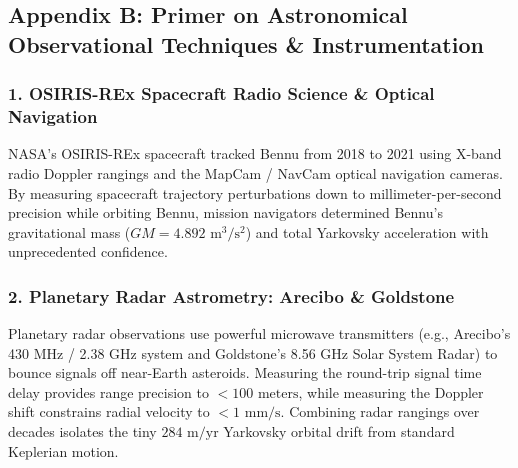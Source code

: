 \documentclass[11pt,a4paper]{article}
\begin{document}
\subsection*{Appendix B: Primer on Astronomical Observational Techniques \& Instrumentation}

\subsubsection*{1. OSIRIS-REx Spacecraft Radio Science \& Optical Navigation}
NASA's OSIRIS-REx spacecraft tracked Bennu from 2018 to 2021 using X-band radio Doppler rangings and the MapCam / NavCam optical navigation cameras. By measuring spacecraft trajectory perturbations down to millimeter-per-second precision while orbiting Bennu, mission navigators determined Bennu's gravitational mass ($G M = 4.892\text{ m}^3/\text{s}^2$) and total Yarkovsky acceleration with unprecedented confidence.

\subsubsection*{2. Planetary Radar Astrometry: Arecibo \& Goldstone}
Planetary radar observations use powerful microwave transmitters (e.g., Arecibo's 430 MHz / 2.38 GHz system and Goldstone's 8.56 GHz Solar System Radar) to bounce signals off near-Earth asteroids. Measuring the round-trip signal time delay provides range precision to $< 100\text{ meters}$, while measuring the Doppler shift constrains radial velocity to $< 1\text{ mm/s}$. Combining radar rangings over decades isolates the tiny $284\text{ m/yr}$ Yarkovsky orbital drift from standard Keplerian motion.
\end{document}
